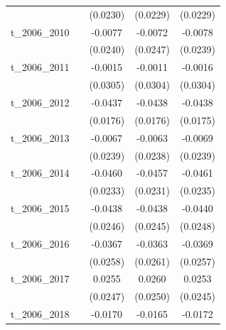 \begin{table}[htbp]
\begin{tabular}{l*{4}{c}}
            &                     &    (0.0230)         &    (0.0229)         &    (0.0229)         \\
[1em]
t\_2006\_2010 &                     &     -0.0077         &     -0.0072         &     -0.0078         \\
            &                     &    (0.0240)         &    (0.0247)         &    (0.0239)         \\
[1em]
t\_2006\_2011 &                     &     -0.0015         &     -0.0011         &     -0.0016         \\
            &                     &    (0.0305)         &    (0.0304)         &    (0.0304)         \\
[1em]
t\_2006\_2012 &                     &     -0.0437\sym{**} &     -0.0438\sym{**} &     -0.0438\sym{**} \\
            &                     &    (0.0176)         &    (0.0176)         &    (0.0175)         \\
[1em]
t\_2006\_2013 &                     &     -0.0067         &     -0.0063         &     -0.0069         \\
            &                     &    (0.0239)         &    (0.0238)         &    (0.0239)         \\
[1em]
t\_2006\_2014 &                     &     -0.0460\sym{**} &     -0.0457\sym{**} &     -0.0461\sym{**} \\
            &                     &    (0.0233)         &    (0.0231)         &    (0.0235)         \\
[1em]
t\_2006\_2015 &                     &     -0.0438\sym{*}  &     -0.0438\sym{*}  &     -0.0440\sym{*}  \\
            &                     &    (0.0246)         &    (0.0245)         &    (0.0248)         \\
[1em]
t\_2006\_2016 &                     &     -0.0367         &     -0.0363         &     -0.0369         \\
            &                     &    (0.0258)         &    (0.0261)         &    (0.0257)         \\
[1em]
t\_2006\_2017 &                     &      0.0255         &      0.0260         &      0.0253         \\
            &                     &    (0.0247)         &    (0.0250)         &    (0.0245)         \\
[1em]
t\_2006\_2018 &                     &     -0.0170         &     -0.0165         &     -0.0172         \\

\end{tabular}
\end{table}
